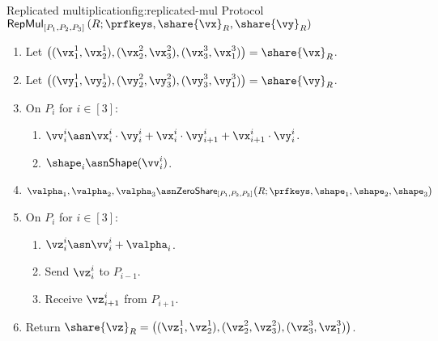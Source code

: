 \begin{Boxfig}{Replicated multiplication}{fig:replicated-mul}
  {Protocol $\mathsf{RepMul}_{[P_1, P_2, P_3]}\left( R; \prfkeys, \share{\vx}_R, \share{\vy}_R \right)$}
  \begin{enumerate}
  \item Let $\left( (\vx_1^1, \vx_2^1), (\vx_2^2, \vx_3^2), (\vx_3^3, \vx_1^3) \right) = \share{\vx}_R$.
  \item Let $\left( (\vy_1^1, \vy_2^1), (\vy_2^2, \vy_3^2), (\vy_3^3, \vy_1^3) \right) = \share{\vy}_R$.

  \item On $P_i$ for $i \in [3]$:
  \begin{enumerate}
    \item $\vv_i^i \asn \vx_i^i \cdot \vy_i^i + \vx_i^i \cdot \vy_{i+1}^i + \vx_{i+1}^i \cdot \vy_i^i$.
    \item $\shape_i \asn \mathsf{Shape}(\vv_i^i)$.
  \end{enumerate}

  \item $\valpha_1, \valpha_2, \valpha_3 \asn \mathsf{ZeroShare}_{[P_1, P_2, P_3]}\big( R; \prfkeys, \shape_1, \shape_2, \shape_3 \big)$

  \item On $P_i$ for $i \in [3]$:
  \begin{enumerate}
    \item $\vz_i^i \asn \vv_i^i + \valpha_i$.
    \item Send $\vz_i^i$ to $P_{i-1}$.
    \item Receive $\vz_{i+1}^i$ from $P_{i+1}$.
  \end{enumerate}

  \item Return $\share{\vz}_R = \left( (\vz_1^1, \vz_2^1), (\vz_2^2, \vz_3^2), (\vz_3^3, \vz_1^3) \right)$.
  \end{enumerate}
\end{Boxfig}


